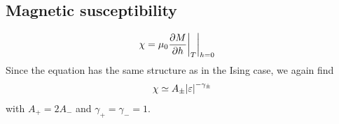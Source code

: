 \subsection{Magnetic susceptibility}

%
\begin{align*}
\chi &= \mu_{0}\frac{\partial M}{\partial h}\bigg|_{T}\bigg|_{h=0}
\end{align*}
%
Since the equation has the same structure as in the Ising case, we again find
%
\begin{align*}
\chi \simeq A_{\pm} \abs{\varepsilon}^{-\gamma_{\pm}}
\end{align*}
%
with $A_{+}= 2 A_{-}$ and $\gamma_{+}=\gamma_{-}=1$.
